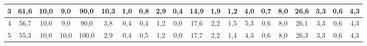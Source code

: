 \begin{sidewaystable}[]
\begin{tabular}{|c|c|c|c|c|c|c|c|c|c|c|c|c|c|c|c|c|c|c|c|}
    3  & 61,6                                            & 10,0                                            & 9,0                                             & 90,0                                            & 10,3                                            & 1,0                                             & 0,8                                             & 2,9                                             & 0,4                                             & 14,9                                             & 1,9                                              & 1,2                                              & 4,0                                              & 0,7                                              & 8,0                                              & 26,6                                             & 3,3                                              & 0,6                                              & 4,3                                              \\ \hline
    4  & 56,7                                            & 10,0                                            & 9,0                                             & 90,0                                            & 3,8                                             & 0,4                                             & 0,4                                             & 1,2                                             & 0,0                                             & 17,6                                             & 2,2                                              & 1,5                                              & 5,3                                              & 0,6                                              & 8,0                                              & 26,1                                             & 3,3                                              & 0,6                                              & 4,3                                              \\ \hline
    5  & 55,3                                            & 10,0                                            & 10,0                                            & 100,0                                           & 2,9                                             & 0,4                                             & 0,5                                             & 1,2                                             & 0,0                                             & 17,7                                             & 2,2                                              & 1,4                                              & 4,3                                              & 0,6                                              & 8,0                                              & 26,3                                             & 3,3                                              & 0,6                                              & 4,3                                              \\ \hline

\end{tabular}
\end{sidewaystable}
